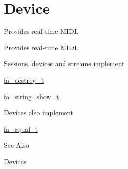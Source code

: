 \hypertarget{group___fa_midi_device}{\section{Device}
\label{group___fa_midi_device}
}


Provides real-\/time M\-I\-D\-I.  


Provides real-\/time M\-I\-D\-I. \begin{DoxyParagraph}{Sessions, devices and streams implement }

\begin{DoxyItemize}
\item \hyperlink{structfa__destroy__t}{fa\-\_\-destroy\-\_\-t}
\item \hyperlink{structfa__string__show__t}{fa\-\_\-string\-\_\-show\-\_\-t}
\end{DoxyItemize}
\end{DoxyParagraph}
\begin{DoxyParagraph}{Devices also implement }

\begin{DoxyItemize}
\item \hyperlink{structfa__equal__t}{fa\-\_\-equal\-\_\-t}
\end{DoxyItemize}
\end{DoxyParagraph}
\begin{DoxySeeAlso}{See Also}

\begin{DoxyItemize}
\item \hyperlink{md__devices_Devices}{Devices} 
\end{DoxyItemize}
\end{DoxySeeAlso}
